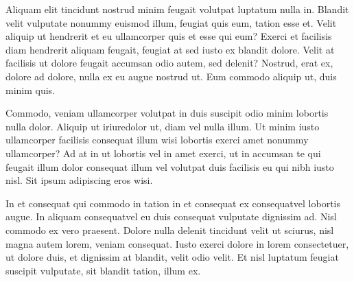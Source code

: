 \documentclass[11pt,draft]{coursepaper}
\begin{document}
     Aliquam elit tincidunt nostrud minim feugait volutpat luptatum nulla in. Blandit velit vulputate nonummy euismod illum, feugiat quis eum, tation esse et. Velit aliquip ut hendrerit et eu ullamcorper quis et esse qui eum? Exerci et facilisis diam hendrerit aliquam feugait, feugiat at sed iusto ex blandit dolore. Velit at facilisis ut dolore feugait accumsan odio autem, sed delenit? Nostrud, erat ex, dolore ad dolore, nulla ex eu augue nostrud ut. Eum commodo aliquip ut, duis minim quis. 
     
     Commodo, veniam ullamcorper volutpat in duis suscipit odio minim lobortis nulla dolor. Aliquip ut iriuredolor ut, diam vel nulla illum. Ut minim iusto ullamcorper facilisis consequat illum wisi lobortis exerci amet nonummy ullamcorper? Ad at in ut lobortis vel in amet exerci, ut in accumsan te qui feugait illum dolor consequat illum vel volutpat duis facilisis eu qui nibh iusto nisl. Sit ipsum adipiscing eros wisi. 
     
     In et consequat qui commodo in tation in et consequat ex consequatvel lobortis augue. In aliquam consequatvel eu duis consequat vulputate dignissim ad. Nisl commodo ex vero praesent. Dolore nulla delenit tincidunt velit ut sciurus, nisl magna autem lorem, veniam consequat. Iusto exerci dolore in lorem consectetuer, ut dolore duis, et dignissim at blandit, velit odio velit. Et nisl luptatum feugiat suscipit vulputate, sit blandit tation, illum ex. 
\end{document}
